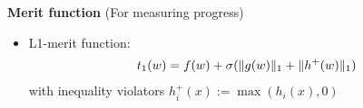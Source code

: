 \begin{tcolorbox}[colback=blue!5!white,colframe=blue!75!black,title=\textbf{Basics}]
\textbf{Merit function} (For measuring progress)\\
\begin{itemize}
\item L1-merit function:
  \begin{align*}
    t_1(w)=f(w)+\sigma( \lVert g(w)\rVert_1 + \lVert h^+(w)\rVert_1)
  \end{align*}
  with inequality violators $h_i^+(x):=\max(h_i(x), 0)$
\end{itemize}
\end{tcolorbox}


